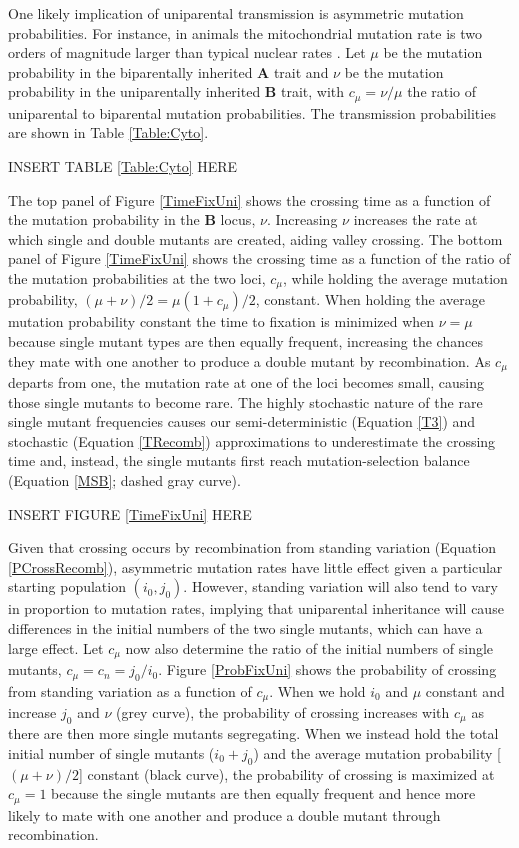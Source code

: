 \documentclass[review,3p,authoryear]{elsarticle}
\begin{document}
One likely implication of uniparental transmission is asymmetric mutation probabilities.
For instance, in animals the mitochondrial mutation rate is two orders of magnitude larger than typical nuclear rates \citep{Linnane1989}.
Let $\mu$ be the mutation probability in the biparentally inherited $\mathbf{A}$ trait and $\nu$ be the mutation probability in the uniparentally inherited $\mathbf{B}$ trait, with $c_\mu=\nu/\mu$ the ratio of uniparental to biparental mutation probabilities. 
The transmission probabilities are shown in Table \ref{Table:Cyto}.

INSERT TABLE \ref{Table:Cyto} HERE

The top panel of Figure \ref{TimeFixUni} shows the crossing time as a function of the mutation probability in the $\mathbf{B}$ locus, $\nu$.
Increasing $\nu$ increases the rate at which single and double mutants are created, aiding valley crossing.
The bottom panel of Figure \ref{TimeFixUni} shows the crossing time as a function of the ratio of the mutation probabilities at the two loci, $c_\mu$, while holding the average mutation probability, $(\mu + \nu)/2 = \mu(1+c_\mu)/2$, constant.
When holding the average mutation probability constant the time to fixation is minimized when $\nu = \mu$ because single mutant types are then equally frequent, increasing the chances they mate with one another to produce a double mutant by recombination.
As $c_\mu$ departs from one, the mutation rate at one of the loci becomes small, causing those single mutants to become rare.
The highly stochastic nature of the rare single mutant frequencies causes our semi-deterministic (Equation \ref{T3}) and stochastic (Equation \ref{TRecomb}) approximations to underestimate the crossing time and, instead, the single mutants first reach mutation-selection balance (Equation \ref{MSB}; dashed gray curve). 

INSERT FIGURE \ref{TimeFixUni} HERE

Given that crossing occurs by recombination from standing variation (Equation \ref{PCrossRecomb}), asymmetric mutation rates have little effect given a particular starting population $(i_0,j_0)$.
However, standing variation will also tend to vary in proportion to mutation rates, implying that uniparental inheritance will cause differences in the initial numbers of the two single mutants, which can have a large effect. 
Let $c_\mu$ now also determine the ratio of the initial numbers of single mutants, $c_\mu=c_n=j_0/i_0$.
Figure \ref{ProbFixUni} shows the probability of crossing from standing variation as a function of $c_\mu$. 
When we hold $i_0$ and $\mu$ constant and increase $j_0$ and $\nu$ (grey curve), the probability of crossing increases with $c_\mu$ as there are then more single mutants segregating.
When we instead hold the total initial number of single mutants ($i_0+j_0$) and the average mutation probability [$(\mu+\nu)/2$] constant (black curve), the probability of crossing is maximized at $c_\mu=1$ because the single mutants are then equally frequent and hence more likely to mate with one another and produce a double mutant through recombination.  
\end{document}
